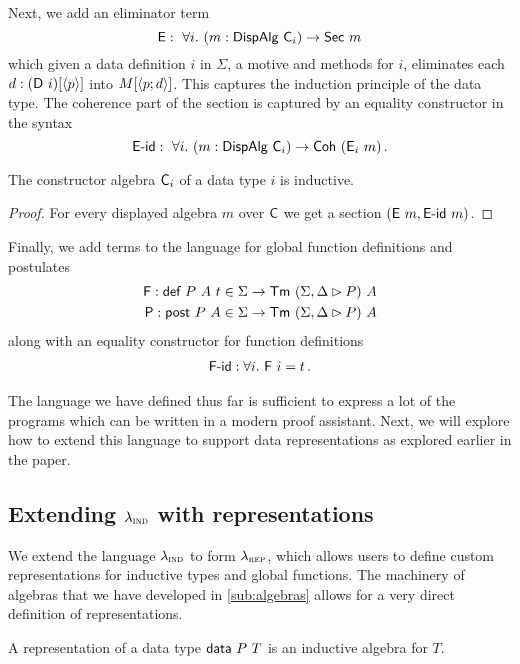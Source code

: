Next, we add an eliminator term
\[
	\textsf{E} :\ \forall i.\ (m : \textsf{DispAlg}\ \textsf{C}_i) \to \textsf{Sec}\ m
\]
which given a data definition $i$ in $\Sigma$, a motive and methods for $i$,
eliminates each $d : (\textsf{D}\ i)[\langle p\rangle]$ into $M[\langle p;d\rangle]$. This captures
the induction principle of the data type. The coherence part of the section is
captured by an equality constructor in the syntax
\[
	\mta{E-id} :\ \forall i.\ (m : \mta{DispAlg}\ \mta{C}_i) \to \mta{Coh}\ (\mta{E}_i\ m) \,.
\]
\begin{lemma}
	The constructor algebra $\textsf{C}_i$ of a data type $i$ is inductive.
	\begin{proof}
		For every displayed algebra $m$ over $\textsf{C}$ we get a section $(\textsf{E}\ m, \textsf{E-id}\ m)$.
	\end{proof}
\end{lemma}

Finally, we add terms to the language for global function definitions and postulates
\begin{align*}
	\textsf{F} : \textsf{def}\ P\ A\ t \in \Sigma \to \textsf{Tm}\ (\Sigma, \Delta \rhd P)\ A \\
	\textsf{P} : \textsf{post}\ P\ A \in \Sigma \to \textsf{Tm}\ (\Sigma, \Delta \rhd P)\ A
\end{align*}
along with an equality constructor for function definitions
\begin{align*}
	\textsf{F-id} : \forall i.\ \textsf{F}\ i = t \,.
\end{align*}

The language we have defined thus far is sufficient to express a lot of the
programs which can be written in a modern proof assistant. Next, we will explore
how to extend this language to support data representations as explored earlier
in the paper.

\subsection{Extending $\lambda_{\textsc{ind}}$ with representations} \label{sub:lambdarep}

We extend the language $\lambda_{\textsc{ind}}$ to form $\lambda_{\textsc{rep}}$, which allows users to
define custom representations for inductive types and global functions. The
machinery of algebras that we have developed in \cref{sub:algebras} allows for a
very direct definition of representations.

\begin{definition}
	A representation of a data type $\textsf{data}\ P\ T$ is an inductive algebra for $T$.
\end{definition}

